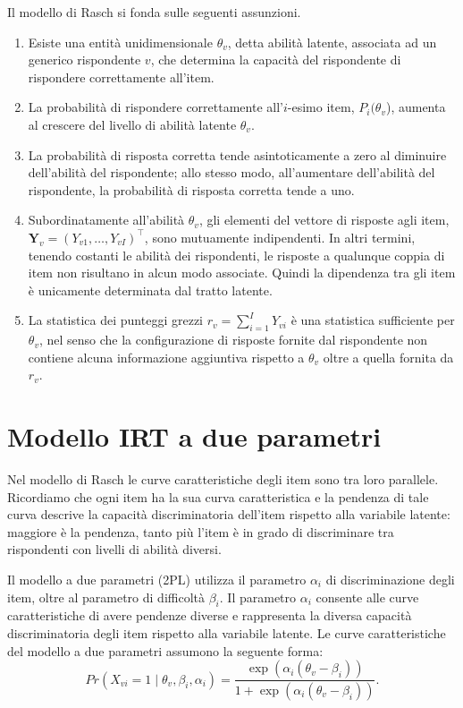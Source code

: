Il modello di Rasch si fonda sulle seguenti assunzioni.
\begin{enumerate}
\item Esiste una entità unidimensionale $\theta_{v}$, detta abilità latente, associata ad un generico rispondente $v$, che determina la capacità del rispondente di rispondere correttamente all'item.  
  \item La probabilità di rispondere correttamente all'$i$-esimo item, $P_i(\theta_v$), aumenta al crescere del livello di abilità latente $\theta_v$.
  \item La probabilità di  risposta corretta  tende asintoticamente a zero al diminuire dell'abilità del rispondente; allo stesso modo, all'aumentare dell'abilità del rispondente, la probabilità di  risposta corretta tende a uno.
  \item Subordinatamente  all'abilità $\theta_v$, gli elementi del vettore di risposte agli item, $\boldsymbol{Y}_v=(Y_{v1}, \dots, Y_{vI})^{\intercal}$, sono mutuamente  indipendenti. 
In altri termini, tenendo costanti le abilità dei rispondenti, le risposte a qualunque coppia di item non risultano in alcun modo associate. 
Quindi la dipendenza tra gli item è unicamente determinata dal tratto latente.
  \item La statistica dei punteggi grezzi $r_v = \sum_{i=1}^{I}Y_{vi}$ è una statistica sufficiente per $\theta_v$, nel senso che la configurazione di risposte fornite dal rispondente non contiene alcuna informazione aggiuntiva rispetto a $\theta_v$ oltre a quella fornita da $r_v$. 
\end{enumerate}

\section{Modello IRT a due parametri}

Nel modello di Rasch le curve caratteristiche degli item sono tra loro parallele. 
Ricordiamo che ogni item ha la sua curva caratteristica e la pendenza di tale curva descrive la capacità discriminatoria dell'item rispetto alla variabile latente: maggiore è la pendenza, tanto più l'item è in grado di discriminare tra rispondenti con livelli di abilità diversi. 

Il modello a due parametri (2PL) utilizza il parametro $\alpha_i$ di discriminazione degli item, oltre al parametro di difficoltà $\beta_i$.  
Il parametro $\alpha_i$ consente alle curve caratteristiche di avere pendenze diverse e rappresenta la diversa capacità discriminatoria degli item rispetto alla variabile latente. 
Le curve caratteristiche del modello a due parametri assumono la seguente forma:
\begin{equation} 
  Pr(X_{vi} = 1 \mid \theta_v, \beta_i, \alpha_i) = \frac{\exp(\alpha_i(\theta_v-\beta_i))}{1+ \exp(\alpha_i(\theta_v-\beta_i))}.
\end{equation}

